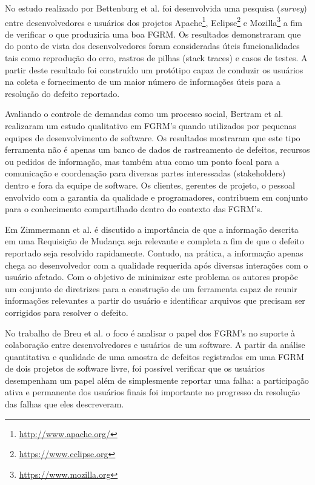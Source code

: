 \documentclass[msc,proposal,hidelot,hideabstract]{ppgccufmg} %
\begin{document}
No estudo realizado por Bettenburg et al. \cite{bettenburg2008makes} foi
desenvolvida uma pesquisa (\textit{survey}) entre desenvolvedores e usuários dos
projetos Apache\footnote{\url{http://www.apache.org/}}, Eclipse\footnote{\url{https://www.eclipse.org}} e Mozilla\footnote{\url{https://www.mozilla.org}} a fim de verificar o que
produziria uma boa FGRM. Os resultados demonstraram que do ponto de vista dos desenvolvedores foram consideradas úteis funcionalidades tais como reprodução do erro, rastros de pilhas (stack traces) e casos de testes. A partir deste resultado foi construído um protótipo capaz de conduzir os usuários na coleta e fornecimento de um maior número de informações úteis para a resolução do defeito reportado.

Avaliando o controle de demandas como um processo social, Bertram et
al. \cite{Bertram:2010:CCB:1718918.1718972} realizaram um estudo qualitativo em
FGRM's quando utilizados por pequenas equipes de desenvolvimento de software. Os resultados mostraram que este tipo ferramenta não é apenas um banco de dados de rastreamento de defeitos, recursos ou pedidos de informação, mas também atua como um ponto focal para a comunicação e coordenação para diversas partes interessadas (stakeholders) dentro e fora da equipe de software. Os
clientes, gerentes de projeto, o pessoal envolvido com a garantia da qualidade
e programadores, contribuem em conjunto para o conhecimento compartilhado dentro do contexto das FGRM's.

Em Zimmermann et al. \cite{5070993} é discutido a importância de que a informação descrita em uma Requisição de Mudança seja relevante e completa a fim de que o defeito reportado seja resolvido rapidamente. Contudo, na prática, a informação apenas chega ao desenvolvedor com a qualidade requerida após diversas interações com o usuário afetado. Com o objetivo de minimizar este
problema os autores propõe um conjunto de diretrizes para a construção de um ferramenta capaz de reunir informações relevantes a partir do usuário e identificar arquivos que precisam ser corrigidos para resolver o defeito.

No trabalho de Breu et al.\cite{Breu:2010:INB:1718918.1718973} o foco é analisar o papel dos FGRM's no suporte à colaboração entre desenvolvedores e usuários de um software. A partir da análise quantitativa e qualidade de uma amostra de defeitos registrados em uma FGRM de dois projetos de software livre, foi possível verificar que os usuários desempenham um papel além de simplesmente reportar uma falha: a participação ativa e permanente dos usuários finais foi importante no progresso da resolução das falhas que eles descreveram.
\end{document}
